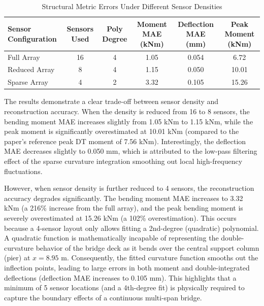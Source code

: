 \documentclass[11pt,journal,onecolumn]{IEEEtran}
\begin{document}
\begin{table}[htbp]
\centering
\caption{Structural Metric Errors Under Different Sensor Densities}
\label{tab:sensitivity_metrics}
\begin{tabular}{lccccc}
\toprule
\textbf{Sensor Configuration} & \textbf{Sensors Used} & \textbf{Poly Degree} & \textbf{Moment MAE (kNm)} & \textbf{Deflection MAE (mm)} & \textbf{Peak Moment (kNm)} \\
\midrule
Full Array & 16 & 4 & 1.05 & 0.054 & 6.72 \\
Reduced Array & 8 & 4 & 1.15 & 0.050 & 10.01 \\
Sparse Array & 4 & 2 & 3.32 & 0.105 & 15.26 \\
\bottomrule
\end{tabular}
\end{table}

The results demonstrate a clear trade-off between sensor density and reconstruction accuracy. When the density is reduced from 16 to 8 sensors, the bending moment MAE increases slightly from 1.05 kNm to 1.15 kNm, while the peak moment is significantly overestimated at 10.01 kNm (compared to the paper's reference peak DT moment of 7.56 kNm). Interestingly, the deflection MAE decreases slightly to 0.050 mm, which is attributed to the low-pass filtering effect of the sparse curvature integration smoothing out local high-frequency fluctuations.

However, when sensor density is further reduced to 4 sensors, the reconstruction accuracy degrades significantly. The bending moment MAE increases to 3.32 kNm (a 216\% increase from the full array), and the peak bending moment is severely overestimated at 15.26 kNm (a 102\% overestimation). This occurs because a 4-sensor layout only allows fitting a 2nd-degree (quadratic) polynomial. A quadratic function is mathematically incapable of representing the double-curvature behavior of the bridge deck as it bends over the central support column (pier) at $x = 8.95$ m. Consequently, the fitted curvature function smooths out the inflection points, leading to large errors in both moment and double-integrated deflections (deflection MAE increases to 0.105 mm). This highlights that a minimum of 5 sensor locations (and a 4th-degree fit) is physically required to capture the boundary effects of a continuous multi-span bridge.
\end{document}
